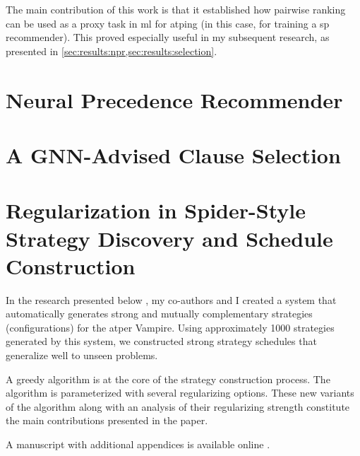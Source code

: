 The main contribution of this work is that it established how pairwise ranking can be used as a proxy task in \gls{ml} for \gls{atping} (in this case, for training a \gls{sp} recommender).
This proved especially useful in my subsequent research,
as presented in \cref{sec:results:npr,sec:results:selection}.


\section{Neural Precedence Recommender}
\label{sec:results:npr}



\section{A GNN-Advised Clause Selection}
\label{sec:results:selection}



\section{Regularization in Spider-Style Strategy Discovery and Schedule Construction}
\label{sec:results:regularization}

In the research presented below \cite{DBLP:conf/ijcar/BartekCS24},
my co-authors and I created a system that automatically generates strong and mutually complementary strategies (configurations) for the \gls{atper} Vampire.
Using approximately 1000 strategies generated by this system,
we constructed strong strategy schedules that generalize well to unseen problems.

A greedy algorithm is at the core of the strategy construction process.
The algorithm is parameterized with several regularizing options.
These new variants of the algorithm along with an analysis of their regularizing strength
constitute the main contributions presented in the paper.

A manuscript with additional appendices is available online \cite{DBLP:journals/corr/abs-2403-12869}.


